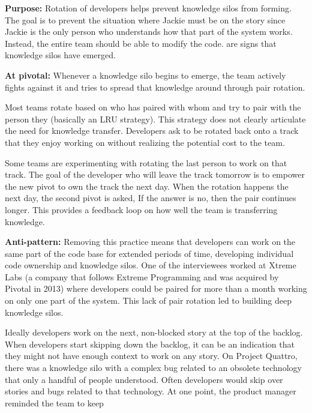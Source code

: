 \begin{table}[]
\textbf{Purpose:} Rotation of developers helps prevent knowledge silos from forming. The goal is to prevent the situation where Jackie must be on the story since Jackie is the only person who understands how that part of the system works. Instead, the entire team should be able to modify the code.  are signs that knowledge silos have emerged. 

\textbf{At pivotal:} Whenever a knowledge silo begins to emerge, the team actively fights against it and tries to spread that knowledge around through pair rotation. 

Most teams rotate based on who has paired with whom and try to pair with the person they  (basically an LRU strategy). This strategy does not clearly articulate the need for knowledge transfer. Developers ask to be rotated back onto a track that they enjoy working on without realizing the potential cost to the team. 

Some teams are experimenting with rotating the last person to work on that track. The goal of the developer who will leave the track tomorrow is to empower the new pivot to own the track the next day. When the rotation happens the next day, the second pivot is asked,  If the answer is no, then the pair continues longer. This provides a feedback loop on how well the team is transferring knowledge.  

\textbf{Anti-pattern:} Removing this practice means that developers can work on the same part of the code base for extended periods of time, developing individual code ownership and knowledge silos. One of the interviewees worked at Xtreme Labs (a company that follows Extreme Programming and was acquired by Pivotal in 2013) where developers could be paired for more than a month working on only one part of the system. This lack of pair rotation led to building deep knowledge silos. 

Ideally developers work on the next, non-blocked story at the top of the backlog. When developers start skipping down the backlog, it can be an indication that they might not have enough context to work on any story. On Project Quattro, there was a knowledge silo with a complex bug related to an obsolete technology that only a handful of people understood. Often developers would skip over stories and bugs related to that technology. At one point, the product manager reminded the team to keep 


\end{table}
